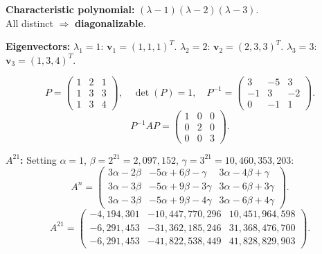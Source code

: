 \documentclass[12pt,a3paper]{article}
\begin{document}
\begin{tcolorbox}[enhanced,breakable,
  colback=cE!4,colframe=cE,boxrule=0.8pt,arc=5pt,
  title={\textbf{Answer --- Diagonalizability \& $A^{21}$ for
    $A=\begin{pmatrix}-1&4&-2\\-3&4&0\\-3&1&3\end{pmatrix}$}},
  fonttitle=\bfseries\color{white},colbacktitle=cE]

\textbf{Characteristic polynomial:} $(\lambda-1)(\lambda-2)(\lambda-3)$.\\
All distinct $\Rightarrow$ \textbf{diagonalizable}.

\textbf{Eigenvectors:}
$\lambda_1=1$: $\mathbf{v}_1=(1,1,1)^T$.\quad
$\lambda_2=2$: $\mathbf{v}_2=(2,3,3)^T$.\quad
$\lambda_3=3$: $\mathbf{v}_3=(1,3,4)^T$.

\[
  P=\begin{pmatrix}1&2&1\\1&3&3\\1&3&4\end{pmatrix},\quad
  \det(P)=1,\quad
  P^{-1}=\begin{pmatrix}3&-5&3\\-1&3&-2\\0&-1&1\end{pmatrix}.
\]
\[
  P^{-1}AP=\begin{pmatrix}1&0&0\\0&2&0\\0&0&3\end{pmatrix}.
\]

\textbf{$A^{21}$:} Setting $\alpha=1$, $\beta=2^{21}=2{,}097{,}152$,
$\gamma=3^{21}=10{,}460{,}353{,}203$:
\[
  A^n=\begin{pmatrix}
    3\alpha-2\beta & -5\alpha+6\beta-\gamma & 3\alpha-4\beta+\gamma\\
    3\alpha-3\beta & -5\alpha+9\beta-3\gamma & 3\alpha-6\beta+3\gamma\\
    3\alpha-3\beta & -5\alpha+9\beta-4\gamma & 3\alpha-6\beta+4\gamma
  \end{pmatrix}.
\]
\[
  \boxed{A^{21}=\begin{pmatrix}
    -4{,}194{,}301 & -10{,}447{,}770{,}296 & 10{,}451{,}964{,}598\\
    -6{,}291{,}453 & -31{,}362{,}185{,}246 & 31{,}368{,}476{,}700\\
    -6{,}291{,}453 & -41{,}822{,}538{,}449 & 41{,}828{,}829{,}903
  \end{pmatrix}.}
\]

\end{tcolorbox}
\end{document}
